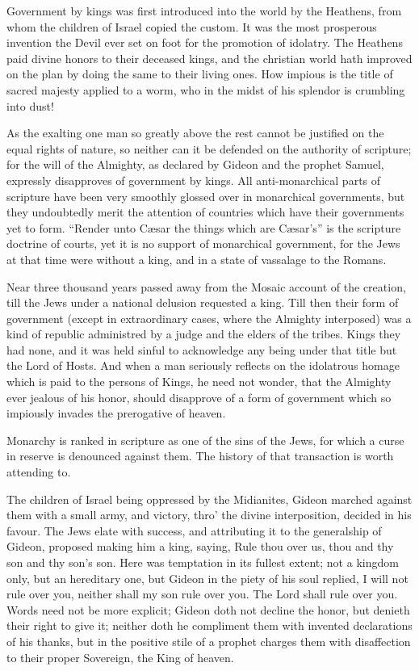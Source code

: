\documentclass[12pt,oneside]{memoir}
\begin{document}
Government by kings was first introduced into the world by the Heathens, from whom the children of Israel copied the custom. It was the most prosperous invention the Devil ever set on foot for the promotion of idolatry. The Heathens paid divine honors to their 
deceased kings, and the christian world hath improved on the plan by doing the same to their living ones. How impious is the title of sacred majesty applied to a worm, who in the midst of his splendor is crumbling into dust!

As the exalting one man so greatly above the rest cannot be justified on the equal rights of nature, so neither can it be defended on the authority of scripture; for the will of the Almighty, as declared by Gideon and the prophet Samuel, expressly disapproves of government by kings. All anti-monarchical parts of scripture have been very smoothly glossed over in monarchical governments, but they undoubtedly merit the attention of countries which have their governments yet to form. ``Render unto Cæsar the things which are Cæsar's'' is the scripture doctrine of courts, yet it is no support of monarchical government, for the Jews at that time were without a king, and in a state of vassalage to the Romans.

Near three thousand years passed away from the Mosaic account of the creation, till the Jews under a national delusion requested a king. Till then their form of government (except in extraordinary cases, where the Almighty interposed) was a kind of republic administred by a judge and the elders of the tribes. Kings they had none, and it was held sinful to acknowledge any being under that title but the Lord of Hosts. And when a man seriously reflects on the idolatrous homage which is paid to the persons of Kings, he need not wonder, that the Almighty ever jealous of his honor, should disapprove of a form of government which so impiously invades the prerogative of heaven.

Monarchy is ranked in scripture as one of the sins of the Jews, for which a curse in reserve is denounced against them. The history of that transaction is worth attending to.

The children of Israel being oppressed by the Midianites, Gideon marched against them with a small army, and victory, thro' the divine interposition, decided in his favour. The Jews elate with success, and attributing it to the generalship of Gideon, proposed making him a king, saying, Rule thou over us, thou and thy son and thy son's son. Here was temptation in its fullest extent; not a kingdom only, but an hereditary one, but Gideon in the piety of his soul replied, I will not rule over you, neither shall my son rule over you. The Lord shall rule over you. Words need not be more explicit; Gideon doth not decline the honor, but denieth their right to give it; neither doth he compliment them with invented declarations of his thanks, but in the positive stile of a prophet charges them with disaffection to their proper Sovereign, the King of heaven.
\end{document}
